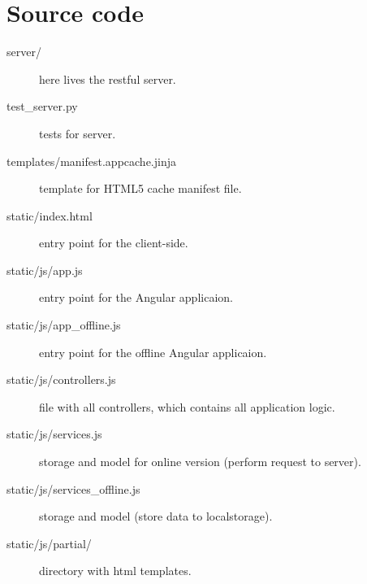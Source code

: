 \documentclass[12pt,a4paper]{article}
\begin{document}
\section{Source code}
    \begin{description}
        \item[server/] here lives the restful server.
        \item[test\_server.py] tests for server.
        \item[templates/manifest.appcache.jinja] template for HTML5 cache manifest file.
        \item[static/index.html] entry point for the client-side.
        \item[static/js/app.js] entry point for the Angular applicaion.
        \item[static/js/app\_offline.js] entry point for the offline Angular applicaion.
        \item[static/js/controllers.js] file with all controllers, which contains all application logic.
        \item[static/js/services.js] storage and model for online version (perform request to server).
        \item[static/js/services\_offline.js] storage and model (store data to localstorage).
        \item[static/js/partial/] directory with html templates.
    \end{description}
\end{document}
